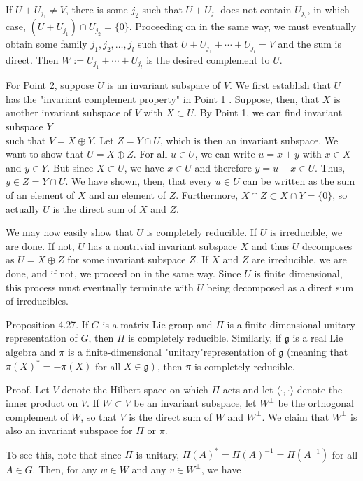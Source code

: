 \documentclass[10pt, letterpaper]{article}
\begin{document}
If $U+U_{j_{1}} \neq V$, there is some $j_{2}$ such that $U+U_{j_{1}}$ does not contain $U_{j_{2}}$, in which case, $\left(U+U_{j_{1}}\right) \cap U_{j_{2}}=\{0\}$. Proceeding on in the same way, we must eventually obtain some family $j_{1}, j_{2}, \ldots, j_{l}$ such that $U+U_{j_{1}}+\cdots+U_{j_{l}}=V$ and the sum is direct. Then $W:=U_{j_{1}}+\cdots+U_{j_{l}}$ is the desired complement to $U$.

For Point 2, suppose $U$ is an invariant subspace of $V$. We first establish that $U$ has the "invariant complement property" in Point 1 . Suppose, then, that $X$ is another invariant subspace of $V$ with $X \subset U$. By Point 1, we can find invariant subspace $Y$\\
such that $V=X \oplus Y$. Let $Z=Y \cap U$, which is then an invariant subspace. We want to show that $U=X \oplus Z$. For all $u \in U$, we can write $u=x+y$ with $x \in X$ and $y \in Y$. But since $X \subset U$, we have $x \in U$ and therefore $y=u-x \in U$. Thus, $y \in Z=Y \cap U$. We have shown, then, that every $u \in U$ can be written as the sum of an element of $X$ and an element of $Z$. Furthermore, $X \cap Z \subset X \cap Y=\{0\}$, so actually $U$ is the direct sum of $X$ and $Z$.

We may now easily show that $U$ is completely reducible. If $U$ is irreducible, we are done. If not, $U$ has a nontrivial invariant subspace $X$ and thus $U$ decomposes as $U=X \oplus Z$ for some invariant subspace $Z$. If $X$ and $Z$ are irreducible, we are done, and if not, we proceed on in the same way. Since $U$ is finite dimensional, this process must eventually terminate with $U$ being decomposed as a direct sum of irreducibles.

Proposition 4.27. If $G$ is a matrix Lie group and $\Pi$ is a finite-dimensional unitary representation of $G$, then $\Pi$ is completely reducible. Similarly, if $\mathfrak{g}$ is a real Lie algebra and $\pi$ is a finite-dimensional "unitary"representation of $\mathfrak{g}$ (meaning that $\pi(X)^{*}=-\pi(X)$ for all $\left.X \in \mathfrak{g}\right)$, then $\pi$ is completely reducible.

Proof. Let $V$ denote the Hilbert space on which $\Pi$ acts and let $\langle\cdot, \cdot\rangle$ denote the inner product on $V$. If $W \subset V$ be an invariant subspace, let $W^{\perp}$ be the orthogonal complement of $W$, so that $V$ is the direct sum of $W$ and $W^{\perp}$. We claim that $W^{\perp}$ is also an invariant subspace for $\Pi$ or $\pi$.

To see this, note that since $\Pi$ is unitary, $\Pi(A)^{*}=\Pi(A)^{-1}=\Pi\left(A^{-1}\right)$ for all $A \in G$. Then, for any $w \in W$ and any $v \in W^{\perp}$, we have
\end{document}
